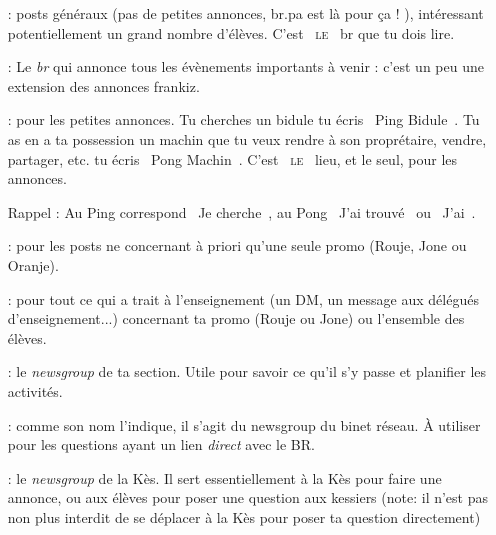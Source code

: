 \begin{itemize}
\item[\ngname{br.eleves} :] posts généraux (pas de petites annonces, br.pa est là pour ça ! ), intéressant potentiellement un grand nombre d'élèves. C'est \guillemotleft{}~\textsc{le}~\guillemotright{} br que tu dois lire.

\item[\ngname{br.eleves.evenements} :] Le \emph{br} qui annonce tous les évènements importants à venir : c'est un peu une extension des annonces frankiz.
	 
\item[\ngname{br.pa} :] pour les petites annonces. Tu cherches un bidule tu écris \guillemotleft{}~Ping Bidule~\guillemotright{}. Tu as en a ta possession un machin que tu veux rendre à son proprétaire, vendre, partager, etc. tu écris \guillemotleft{}~Pong Machin~\guillemotright{}. C'est \guillemotleft{}~\textsc{le}~\guillemotright{} lieu, et le seul, pour les annonces.

\smallskip

Rappel : Au Ping correspond \guillemotleft{}~Je cherche~\guillemotright{}, au Pong \guillemotleft{}~J'ai trouvé~\guillemotright{} ou \guillemotleft{}~J'ai~\guillemotright{}.

\smallskip


\item[\ngname{br.promo.ta\_promo} :] pour les posts ne concernant à priori qu'une seule promo (Rouje, Jone ou Oranje).
	 
\item[\ngname{br.enseignement.*} :] pour tout ce qui a trait à l'enseignement (un DM, un message aux délégués d'enseignement...) concernant ta promo (Rouje ou Jone) ou l'ensemble des élèves.
 
\item[\ngname{br.section.ta\_section\_sportive} :] le \emph{newsgroup} de ta section. Utile pour savoir ce qu'il s'y passe et planifier les activités.

\item[\ngname{br.binet.br} :] comme son nom l'indique, il s'agit du newsgroup du binet réseau. \`A utiliser pour les questions ayant un lien \emph{direct} avec le BR.

\item[\ngname{br.kes} :] le \emph{newsgroup} de la Kès. Il sert essentiellement à la Kès pour faire une annonce, ou aux élèves pour poser une question aux kessiers (note: il n'est pas non plus interdit de se déplacer à la Kès pour poser ta question directement)

\end{itemize}



